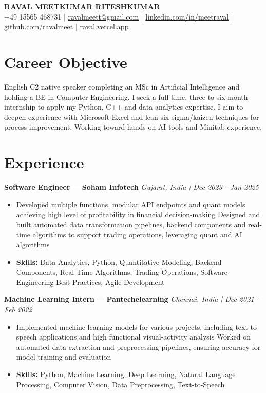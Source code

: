 \documentclass[a4paper,10pt]{article}
\begin{document}
\begin{center}
  {\Large\bfseries RAVAL MEETKUMAR RITESHKUMAR}\\[2pt]
  {\small +49 15565 468731 \;|\; \href{mailto:ravalmeett@gmail.com}{ravalmeett@gmail.com} \;|\; \href{https://www.linkedin.com/in/meetraval/}{linkedin.com/in/meetraval} \;|\; \href{https://github.com/ravalmeet}{github.com/ravalmeet} \;|\; \href{https://raval.vercel.app/}{raval.vercel.app}}
\end{center}
\vspace{-3pt}

\section*{Career Objective}
English C2 native speaker completing an MSc in Artificial Intelligence and holding a BE in Computer Engineering, I seek a full-time, three-to-six-month internship to apply my Python, C++ and data analytics expertise. I aim to deepen experience with Microsoft Excel and lean six sigma/kaizen techniques for process improvement. Working toward hands-on AI tools and Minitab experience.\par

\section*{Experience}
\textbf{Software Engineer} — \textbf{Soham Infotech} \hfill \textit{Gujarat, India \;|\; Dec 2023 - Jan 2025}\par
\vspace{1pt}
\begin{itemize}
  \item Developed multiple functions, modular API endpoints and quant models achieving high level of profitability in financial decision-making Designed and built automated data transformation pipelines, backend components and real-time algorithms to support trading operations, leveraging quant and AI algorithms
  \item \textbf{Skills:} Data Analytics, Python, Quantitative Modeling, Backend Components, Real-Time Algorithms, Trading Operations, Software Engineering Best Practices, Agile Development
\end{itemize}
\vspace{3pt}
\textbf{Machine Learning Intern} — \textbf{Pantechelearning} \hfill \textit{Chennai, India \;|\; Dec 2021 - Feb 2022}\par
\vspace{1pt}
\begin{itemize}
  \item Implemented machine learning models for various projects, including text-to-speech applications and high functional visual-activity analysis Worked on automated data extraction and preprocessing pipelines, ensuring accuracy for model training and evaluation
  \item \textbf{Skills:} Python, Machine Learning, Deep Learning, Natural Language Processing, Computer Vision, Data Preprocessing, Text-to-Speech
\end{itemize}
\end{document}
